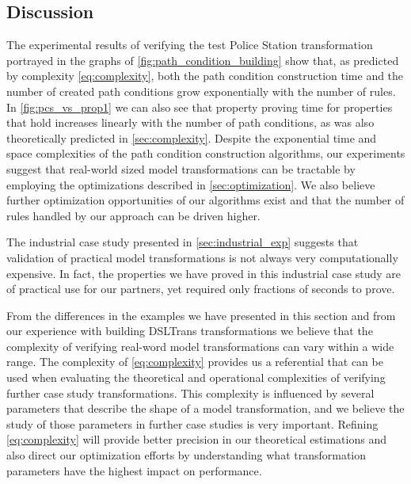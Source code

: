\subsection{Discussion}

The experimental results of verifying the test Police Station transformation
portrayed in the graphs of \cref{fig:path_condition_building} show that,
as predicted by complexity \cref{eq:complexity}, both the path condition
construction time and the number of created path conditions grow exponentially
with the number of rules.
In \cref{fig:pcs_vs_prop1} we can also see that property proving time for
properties that hold increases linearly with the number of path conditions, as
was also theoretically predicted in \cref{sec:complexity}. Despite the exponential time
and space complexities of the path condition construction algorithms, our
experiments suggest that real-world sized model transformations can be tractable
by employing the optimizations described in \cref{sec:optimization}.
We also believe further optimization opportunities of our algorithms exist and that the number of rules handled by our approach can be driven higher.

The industrial case study presented in \cref{sec:industrial_exp} suggests
that validation of practical model transformations is not always very
computationally expensive. In fact, the properties we have proved in this
industrial case study are of practical use for our partners, yet required only fractions of seconds to prove.

From the differences in the examples we have presented in this section and from
our experience with building DSLTrans transformations we believe that the
complexity of verifying real-word model transformations can vary within a wide
range. The complexity of \cref{eq:complexity} provides us a referential that can
be used when evaluating the theoretical and operational complexities of
verifying further case study transformations. This complexity is influenced by several parameters that describe the shape of a model
transformation, and we believe the study of those parameters in further case studies is very
important. Refining \cref{eq:complexity} will provide better precision in our theoretical estimations and also direct our
optimization efforts by understanding what transformation parameters have the
highest impact on performance.

